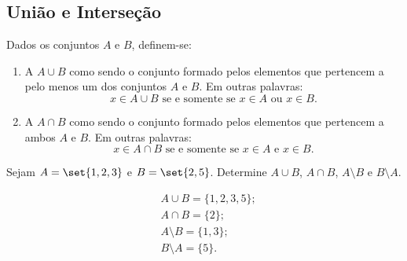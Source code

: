 \subsection{União e Interseção}

\begin{definition}
Dados os conjuntos $A$ e $B$, definem-se:

\begin{enumerate}
	\item A  $A \cup B$ como sendo o conjunto formado pelos elementos que pertencem a pelo menos um dos conjuntos $A$ e $B$. Em outras palavras:
		$$ x \in A \cup B \text{ se e somente se } x \in A \text{ ou } x \in B. $$
	\item A  $A \cap B$ como sendo o conjunto formado pelos elementos que pertencem a ambos $A$ e $B$. Em outras palavras:
		$$ x \in A \cap B \text{ se e somente se } x \in A \text{ e } x \in B. $$
\end{enumerate}
\end{definition}

\begin{example}
Sejam $A = \set{1, 2, 3}$ e $ B = \set{2,5}$. Determine $A \cup B$, $A \cap B$, $A \setminus B$ e $B \setminus A$.
\end{example}

\begin{solution}
\begin{align*}
	&A \cup B = \{1,2,3,5\};\\
	&A \cap B = \{2\};\\
	&A \setminus B = \{1,3\};\\
	&B \setminus A = \{5\}.
\end{align*}
\end{solution}

